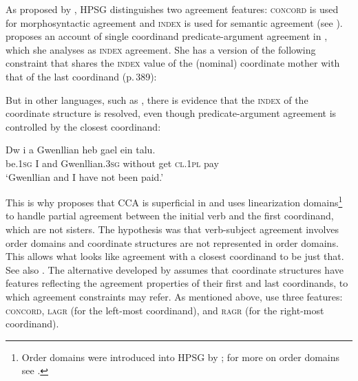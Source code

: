 As proposed by \citet[Chapter~2]{wechsler}, HPSG distinguishes two agreement features: \textsc{concord} is used for
morphosyntactic agreement and \textsc{index} is used for semantic agreement (see
). \citet{Moosally} proposes an account
of single coordinand predicate-argument agreement in , which she analyses as  \textsc{index} agreement. She has  a version of the following 
constraint that shares the \textsc{index} value of the (nominal) coordinate mother with that of the
last coordinand (p.\,389):

\ea
{}
\z


But in other languages, such as , there is evidence that the \textsc{index} of the coordinate
structure is resolved, even though predicate-argument agreement is controlled by the closest coordinand: 

\ea 
\gll Dw              i a   Gwenllian              heb     gael ein                      talu.\footnotemark\\
     be.1\textsc{sg} I and Gwenllian.3\textsc{sg} without get  \textsc{cl}.1\textsc{pl} pay \\
\glt  `Gwenllian and I have not been paid.'
\z

\noindent
This is why \citet{Borsley:2009} proposes that CCA is superficial in  and uses linearization domains\label{page-linearization-domains-in-coordination-one}\footnote{%
  Order domains were introduced into HPSG by \citet{Reape94a}; for more on order domains see
  .
} to handle partial agreement between the initial verb and the first coordinand, which are not sisters.
The hypothesis  was that verb-subject agreement involves order domains and coordinate structures are
not represented in order domains. This allows what looks like agreement with a closest coordinand to
be just that. See also . The alternative developed by \citet{Villavicencio:Sadler:ea:05} assumes that
coordinate structures have features reflecting the agreement properties of their first and last
coordinands, to which agreement constraints may refer. As mentioned above,
\citet{Villavicencio:Sadler:ea:05} use three features: \textsc{concord}, \textsc{lagr} (for the
left-most coordinand), and \textsc{ragr} (for the right-most coordinand). 

